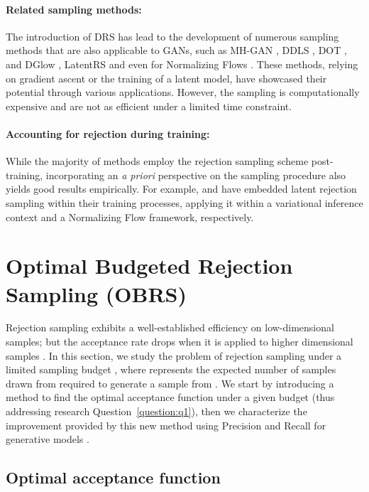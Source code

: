 \documentclass[twoside]{article}
\begin{document}
\paragraph{Related sampling methods:} The introduction of DRS has lead to the development of numerous sampling methods that are also applicable to GANs, such as MH-GAN \citep{turner_metropolis-hastings_2019}, DDLS \citep{che_your_2021}, DOT \citep{tanaka_discriminator_2019}, and DGlow \citep{ansari_refining_2021}, LatentRS \citep{issenhuth_latent_2022} and even for Normalizing Flows \citep{stimper_resampling_2022}. These methods, relying on gradient ascent or the training of a latent model, have showcased their potential through various applications. However, the sampling is computationally expensive and are not as efficient under a limited time constraint.    
\paragraph{Accounting for rejection during training:} While the majority of methods employ the rejection sampling scheme post-training, incorporating an \textit{a priori} perspective on the sampling procedure also yields good results empirically. For example, \citet{grover_variational_2018} and  \citet{stimper_resampling_2022} have embedded latent rejection sampling within their training processes, applying it within a variational inference context and a Normalizing Flow framework, respectively. 





\section{Optimal Budgeted Rejection Sampling (OBRS)}
\label{sec:optirej}
Rejection sampling exhibits a well-established efficiency on low-dimensional samples; but the acceptance rate drops when it is applied to higher dimensional samples \citep{mackay_information_2005}. In this section, we study the problem of rejection sampling under a limited sampling budget , where  represents the expected  number of samples drawn from  required to generate a sample from . We start by introducing a method to find the optimal acceptance function under a given budget  (thus addressing research Question~\ref{question:q1}), then  we characterize the improvement provided by this new method using  Precision and Recall for generative models \citep{sajjadi_assessing_2018}. 

\subsection{Optimal acceptance function}
\end{document}
